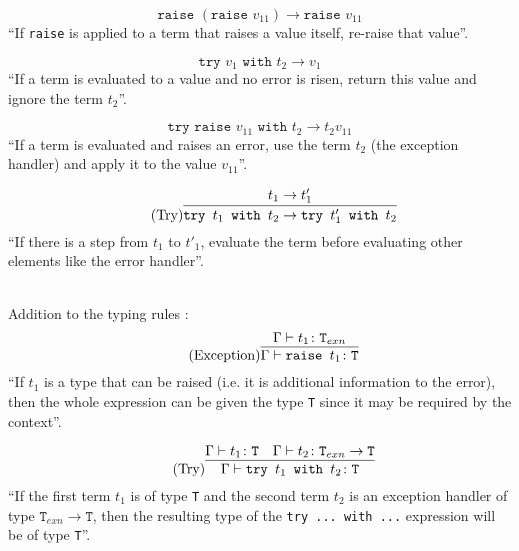 \begin{equation*}
    \tag{Re-Raise}
    \texttt{raise } (\texttt{raise } v_{11}) \rightarrow \texttt{raise } v_{11}
\end{equation*}
``If \texttt{raise} is applied to a term that raises a value itself, re-raise that
value''.

\begin{equation*}
    \tag{Try Value}
    \texttt{try } v_1 \texttt{ with } t_2 \rightarrow v_1
\end{equation*}
``If a term is evaluated to a value and no error is risen, return
this value and ignore the term $t_2$''.

\begin{equation*}
    \tag{Try Error}
    \texttt{try } \texttt{raise } v_{11} \texttt{ with } t_2 \rightarrow t_2 v_{11}
\end{equation*}
``If a term is evaluated and raises an error, use the term $t_2$ (the exception
handler) and apply it to the value $v_{11}$''.

\begin{equation*}
    \tag{Try}
    \infer{
        \texttt{try } t_1 \texttt{ with } t_2 \rightarrow \texttt{try } t'_1 \texttt{ with } t_2
    }{
        t_1 \rightarrow t'_1
    }
\end{equation*}
``If there is a step from $t_1$ to $t'_1$, evaluate the term
before evaluating other elements like the error handler''.

~\\
Addition to the typing rules \cite{pierce2002ProgLang}:
\begin{equation*}
    \tag{Exception}
    \infer{
        \Gamma \vdash \texttt{raise } t_1 \colon \texttt{T}
    }{
        \Gamma \vdash t_1 \colon \texttt{T}_{exn}
    }
\end{equation*}
``If $t_1$ is a type that can be raised (i.e. it is
additional information to the error), then the whole
expression can be given the type \texttt{T} since it may be required
by the context''.

\begin{equation*}
    \tag{Try}
    \infer{
        \Gamma \vdash \texttt{try } t_1 \texttt{ with } t_2 \colon \texttt{T}
    }{
        \Gamma \vdash t_1 \colon \texttt{T}
        &
        \Gamma \vdash t_2 \colon \texttt{T}_{exn} \rightarrow \texttt{T}
    }
\end{equation*}
``If the first term $t_1$ is of type \texttt{T} and the second
term $t_2$ is an exception handler of type $\texttt{T}_{exn} \rightarrow \texttt{T}$,
then the resulting type of the \texttt{try ... with ...} expression will
be of type \texttt{T}''.
